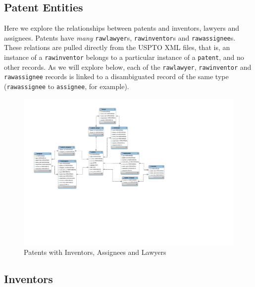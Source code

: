 \subsection*{Patent Entities}

Here we explore the relationships between patents and inventors, lawyers and assignees.  Patents have \emph{many} \verb`rawlawyer`s, \verb`rawinventor`s and \verb`rawassignee`s. These relations are pulled directly from the USPTO XML files, that is, an instance of a \verb`rawinventor` belongs to a particular instance of a \verb`patent`, and no other records. As we will explore below, each of the \verb`rawlawyer`, \verb`rawinventor` and \verb`rawassignee` records is linked to a disambiguated record of the same type (\verb`rawassignee` to \verb`assignee`, for example).

\begin{figure}[!htbp]
\includegraphics[width=\linewidth]{figs/Patententities}
\caption{Patents with Inventors, Assignees and Lawyers}
\end{figure}

\subsection*{Inventors}

